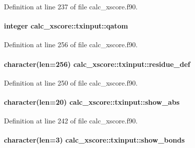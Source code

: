Definition at line 237 of file calc\-\_\-xscore.\-f90.

\hypertarget{structcalc__xscore_1_1txinput_a4c517e156858f8f15f37b5fd8b74ba9d}{
\paragraph[{qatom}]{\setlength{\rightskip}{0pt plus 5cm}integer calc\-\_\-xscore\-::txinput\-::qatom}}\label{structcalc__xscore_1_1txinput_a4c517e156858f8f15f37b5fd8b74ba9d}


Definition at line 256 of file calc\-\_\-xscore.\-f90.

\hypertarget{structcalc__xscore_1_1txinput_a262c701fded1a926cc7c0689425bb0f5}{
\paragraph[{residue\-\_\-def}]{\setlength{\rightskip}{0pt plus 5cm}character(len=256) calc\-\_\-xscore\-::txinput\-::residue\-\_\-def}}\label{structcalc__xscore_1_1txinput_a262c701fded1a926cc7c0689425bb0f5}


Definition at line 250 of file calc\-\_\-xscore.\-f90.

\hypertarget{structcalc__xscore_1_1txinput_a95da9ef67643a21423429f38dfa36be1}{
\paragraph[{show\-\_\-abs}]{\setlength{\rightskip}{0pt plus 5cm}character(len=20) calc\-\_\-xscore\-::txinput\-::show\-\_\-abs}}\label{structcalc__xscore_1_1txinput_a95da9ef67643a21423429f38dfa36be1}


Definition at line 242 of file calc\-\_\-xscore.\-f90.

\hypertarget{structcalc__xscore_1_1txinput_a307d617915bda2eb4dbc77d8967d5a67}{
\paragraph[{show\-\_\-bonds}]{\setlength{\rightskip}{0pt plus 5cm}character(len=3) calc\-\_\-xscore\-::txinput\-::show\-\_\-bonds}}\label{structcalc__xscore_1_1txinput_a307d617915bda2eb4dbc77d8967d5a67}


